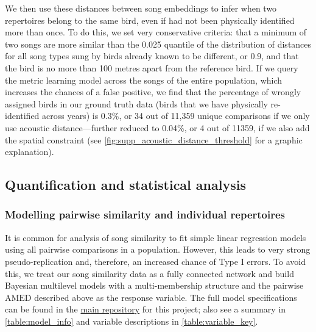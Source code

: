 \documentclass[9pt, onecolumn, twoside, lineno]{gsajnl}
\begin{document}
We then use these distances between song embeddings to infer when two repertoires belong to the same bird, even if had not been physically identified more than once. To do this, we set very conservative criteria: that a minimum of two songs are more similar than the 0.025 quantile of the distribution of distances for all song types sung by birds already known to be different, or 0.9, and that the bird is no more than 100 metres apart from the reference bird. If we query the metric learning model across the songs of the entire population, which increases the chances of a false positive, we find that the percentage of wrongly assigned birds in our ground truth data (birds that we have physically re-identified across years) is 0.3\%, or 34 out of 11,359 unique comparisons if we only use acoustic distance---further reduced to 0.04\%, or 4 out of 11359, if we also add the spatial constraint (see \autoref{fig:supp_acoustic_distance_threshold} for a graphic explanation).

\subsection{Quantification and statistical analysis}

\subsubsection{Modelling pairwise similarity and individual repertoires}

It is common for analysis of song similarity to fit simple linear regression models using all pairwise comparisons in a population. However, this leads to very strong pseudo-replication and, therefore, an increased chance of Type I errors. To avoid this, we treat our song similarity data as a fully connected network and build Bayesian multilevel models with a multi-membership structure and the pairwise $\text{AMED}$ described above as the response variable. The full model specifications can be found in the \href{https://github.com/nilomr/birdsong-demography}{main repository} for this project; also see a summary in \autoref{table:model_info} and variable descriptions in \autoref{table:variable_key}.
\end{document}
